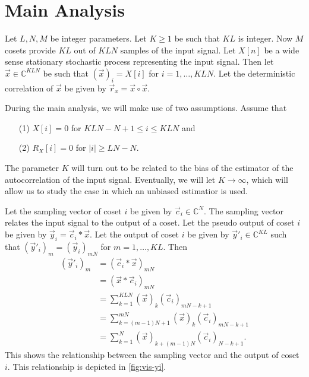 \documentclass[a4paper, openany, oneside]{memoir}
\begin{document}
\section{Main Analysis}

Let $L,N,M$ be integer parameters. Let $K\ge1$ be such that $KL$ is integer. Now $M$ cosets provide $KL$ out of $KLN$ samples of the input signal. Let $X[n]$ be a wide sense stationary stochastic process representing the input signal. Then let $\vec{x} \in \mathbb{C}^{KLN}$ be such that $(\vec{x})_i = X[i]$ for $i = 1,\ldots,KLN$. Let the deterministic correlation of $\vec{x}$ be given by $\vec{r}_x = \vec{x} \circ \vec{x}$.

During the main analysis, we will make use of two assumptions. Assume that
\begin{enumerate}
    \item[(1)] $X[i]=0$ for $ KLN-N+1 \le i \le KLN$ and
    \item[(2)] $R_X[i]=0$ for $|i| \ge LN-N$.
\end{enumerate}

The parameter $K$ will turn out to be related to the bias of the estimator of the autocorrelation of the input signal. Eventually, we will let $K \to \infty$, which will allow us to study the case in which an unbiased estimatior is used.

Let the sampling vector of coset $i$ be given by $\vec{c}_i \in \mathbb{C}^{N}$. The sampling vector relates the input signal to the output of a coset. Let the pseudo output of coset $i$ be given by $\vec{y}_i = \vec{c}_i \ast \vec{x}$. Let the output of coset $i$ be given by $\vec{y}'_i \in \mathbb{C}^{KL}$ such that $(\vec{y}'_i)_m=(\vec{y}_i)_{mN}$ for $m=1,\ldots,KL$. Then
\begin{align*}
    (\vec{y}'_i)_m &= (\vec{c}_i \ast \vec{x})_{mN} \\
    &= (\vec{x} \ast \vec{c}_i)_{mN} \\
    &= \sum_{k=1}^{KLN} (\vec{x})_k (\vec{c}_i)_{mN-k+1} \\
    &= \sum_{k=(m-1)N+1}^{mN} (\vec{x})_k (\vec{c}_i)_{mN-k+1} \\
    &= \sum_{k=1}^{N} (\vec{x})_{k+(m-1)N} (\vec{c}_i)_{N-k+1}.
\end{align*}
This shows the relationship between the sampling vector and the output of coset $i$. This relationship is depicted in \cref{fig:vis-yi}.
\end{document}
